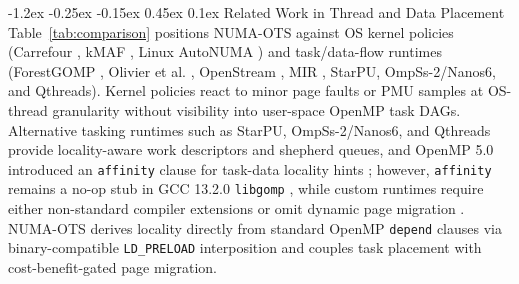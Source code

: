 \documentclass[10pt,twocolumn,letterpaper]{article}
\makeatletter
\renewcommand{\subsection}{\@startsection{subsection}{2}{\z@}%
  {-1.2ex \@plus -0.25ex \@minus -0.15ex}%
  {0.45ex \@plus 0.1ex}%
  {\normalfont\small\itshape}}
\makeatother
\begin{document}
\subsection{Related Work in Thread and Data Placement}
Table~\ref{tab:comparison} positions NUMA-OTS against OS kernel policies (Carrefour \cite{ref6}, kMAF \cite{ref27}, Linux AutoNUMA \cite{ref21}) and task/data-flow runtimes (ForestGOMP \cite{ref12}, Olivier et al. \cite{ref10}, OpenStream \cite{ref11}, MIR \cite{ref13}, StarPU, OmpSs-2/Nanos6, and Qthreads). Kernel policies react to minor page faults or PMU samples at OS-thread granularity without visibility into user-space OpenMP task DAGs. Alternative tasking runtimes such as StarPU, OmpSs-2/Nanos6, and Qthreads provide locality-aware work descriptors and shepherd queues, and OpenMP 5.0 introduced an \texttt{affinity} clause for task-data locality hints \cite{ref7}; however, \texttt{affinity} remains a no-op stub in GCC 13.2.0 \texttt{libgomp} \cite{ref8}, while custom runtimes require either non-standard compiler extensions \cite{ref11,ref13} or omit dynamic page migration \cite{ref10,ref13}. NUMA-OTS derives locality directly from standard OpenMP \texttt{depend} clauses via binary-compatible \texttt{LD\_PRELOAD} interposition and couples task placement with cost-benefit-gated page migration.
\end{document}
